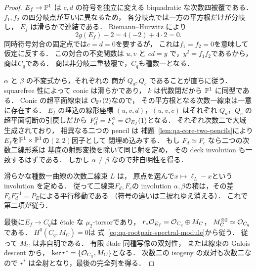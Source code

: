 \begin{proof}
$E_f\to\mathbb P^1$ は $c,d$ の符号を独立に変える
biquadratic な次数四被覆である．
$f_1,f_2$ の四分岐点が互いに異なるため，
各分岐点では一方の平方根だけが分岐し，
$E_f$ は滑らかで連結である．
Riemann--Hurwitz により
\[
 2g(E_f)-2=4(-2)+4\cdot2=0.
\]
同時符号対合の固定点では$c=d=0$を要するが，
これは$f_1=f_2=0$を意味して仮定に反する．
この対合の不変関数は
$u,v$ と $cd=y$ で，$y^2=f_1f_2$であるから，
商は$C_q$である．
商は非分岐二重被覆で，$C_q$も種数一となる．

$\alpha$ と $\beta$ の不変式から，それぞれの
商が $Q_d,Q_c$ であることが直ちに従う．
squarefree 性によって conic は滑らかであり，
$k$ は代数閉だから $\mathbb P^1$ に同型である．
Conic の超平面線束は $\mathcal O_{\mathbb P^1}(2)$なので，
その平方根となる次数一線束は一意に存在する．
$E_f$ の埋込の線形座標
$(u,v,d)$，$(u,v,c)$ はそれぞれ
$Q_d$，$Q_c$ の超平面切断の引戻しだから
$F_d^2=F_c^2=\mathcal O_{E_f}(1)$となる．
それぞれ次数二で大域生成されており，
相異なる二つの pencil は
補題~\ref{lem:qa-core-two-pencils}により
$E_f$を$\mathbb P^1\times\mathbb P^1$の$(2,2)$因子として
閉埋め込みする．
もし $F_d\simeq F_c$ なら二つの次数二線形系は
基底の射影変換を除いて同じ射を定め，
その deck involution も一致するはずである．
しかし $\alpha\ne\beta$ なので非自明性を得る．

滑らかな種数一曲線の次数二線束 $L$ は，
原点を選んで$x\mapsto \ell_L-x$という
involution を定める．
従って二線束$F_d,F_c$の involution
$\alpha,\beta$の積は，その差
$F_cF_d^{-1}=P_E$による平行移動である
（符号の違いは二捩れゆえ消える）．
これで第二項が従う．

最後に$E_f\to C_q$は \'{e}tale な
$\mu_2$-torsorであり，
$r_*\mathcal O_{E_f}=\mathcal O_{C_q}\oplus M_C$，
$M_C^{\otimes2}\simeq\mathcal O_{C_q}$である．
$H^0(C_q,M_C)=0$は
式~\eqref{eq:qa-rootpair-spectral-module}から従う．
従って $M_C$ は非自明である．
有限 \'{e}tale 同種写像の双対性，
または線束の Galois descent から，
$\ker r^*=\{\mathcal O_{C_q},M_C\}$となる．
次数二の isogeny の双対も次数二なので
$r^*$ は全射となり，最後の完全列を得る．
\end{proof}



